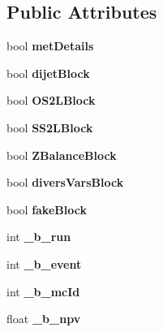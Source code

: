 \subsection*{Public Attributes}
\begin{DoxyCompactItemize}
\item 
\hypertarget{classToyNt_a5a7560b824c6550a475641e41c101821}{
bool {\bfseries metDetails}}
\label{classToyNt_a5a7560b824c6550a475641e41c101821}

\item 
\hypertarget{classToyNt_ad92b641c4c6cbbce0c7d8bbc1928b8c7}{
bool {\bfseries dijetBlock}}
\label{classToyNt_ad92b641c4c6cbbce0c7d8bbc1928b8c7}

\item 
\hypertarget{classToyNt_a96b959146f4defe190c35a7cdcfba6e2}{
bool {\bfseries OS2LBlock}}
\label{classToyNt_a96b959146f4defe190c35a7cdcfba6e2}

\item 
\hypertarget{classToyNt_aaeede8b092bc0863d282fd3e1d25bf8e}{
bool {\bfseries SS2LBlock}}
\label{classToyNt_aaeede8b092bc0863d282fd3e1d25bf8e}

\item 
\hypertarget{classToyNt_a1d6db49285909754914c32058957bc81}{
bool {\bfseries ZBalanceBlock}}
\label{classToyNt_a1d6db49285909754914c32058957bc81}

\item 
\hypertarget{classToyNt_a6dff2584128a975e83d511abe181e7f3}{
bool {\bfseries diversVarsBlock}}
\label{classToyNt_a6dff2584128a975e83d511abe181e7f3}

\item 
\hypertarget{classToyNt_a3bfd074ac07ddc435b99e30a3359612f}{
bool {\bfseries fakeBlock}}
\label{classToyNt_a3bfd074ac07ddc435b99e30a3359612f}

\item 
\hypertarget{classToyNt_a3ebba73519c49cfa320fb82677f652ec}{
int {\bfseries \_\-b\_\-run}}
\label{classToyNt_a3ebba73519c49cfa320fb82677f652ec}

\item 
\hypertarget{classToyNt_a17a8af839a2544b726fc12b041d6888f}{
int {\bfseries \_\-b\_\-event}}
\label{classToyNt_a17a8af839a2544b726fc12b041d6888f}

\item 
\hypertarget{classToyNt_ab7d8dfba1b9bdd70519743e113a711a3}{
int {\bfseries \_\-b\_\-mcId}}
\label{classToyNt_ab7d8dfba1b9bdd70519743e113a711a3}

\item 
\hypertarget{classToyNt_a987e15d3493974719d26878a7249f9c1}{
float {\bfseries \_\-b\_\-npv}}
\label{classToyNt_a987e15d3493974719d26878a7249f9c1}


\end{DoxyCompactItemize}
